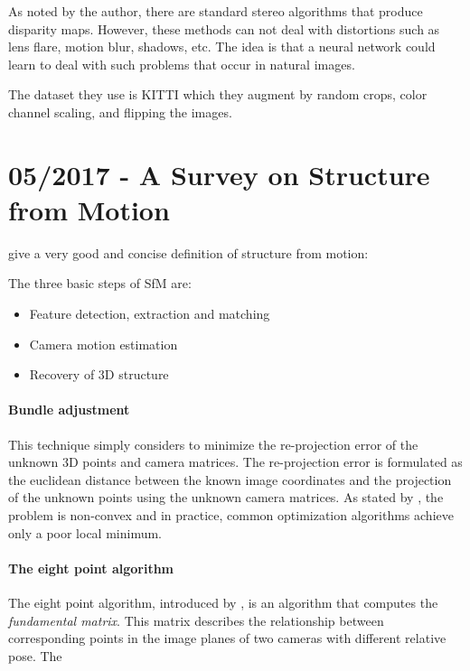 		As noted by the author, there are standard stereo algorithms that produce disparity maps.
		However, these methods can not deal with distortions such as lens flare, motion blur, shadows, etc.
		The idea is that a neural network could learn to deal with such problems that occur in natural images.
		
		The dataset they use is {KITTI} which they augment by random crops, color channel scaling, and flipping the images.
		
		\section{05/2017 - A Survey on Structure from Motion}
		
			\cite{survey2017} give a very good and concise definition of structure from motion:
			
			
			The three basic steps of SfM are:
			\begin{itemize}
				\item Feature detection, extraction and matching
				\item Camera motion estimation
				\item Recovery of 3D structure
			\end{itemize}
			
			\paragraph{Bundle adjustment} 
				This technique simply considers to minimize the re-projection error of the unknown 3D points and camera matrices.
				The re-projection error is formulated as the euclidean distance between the known image coordinates and the projection of the unknown points using the unknown camera matrices.
				As stated by \cite{survey2017}, the problem is non-convex and in practice, common optimization algorithms achieve only a poor local minimum.
				
			\paragraph{The eight point algorithm}
				The eight point algorithm, introduced by \cite{longuet1981}, is an algorithm that computes the \emph{fundamental matrix}.
				This matrix describes the relationship between corresponding points in the image planes of two cameras with different relative pose.
				The 
			
